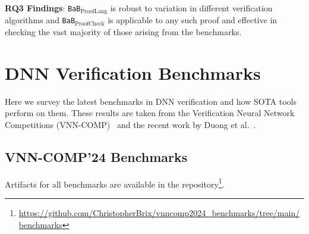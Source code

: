 \documentclass[oneside,11pt,dvipsnames]{book}
\newcommand{\prooflang}{\texttt{BaB$_{\text{ProofLang}}$}}
\newcommand{\proofcheck}{\texttt{BaB$_{\text{ProofCheck}}$}}
\begin{document}
\begin{tcolorbox}[left=1pt,right=1pt,top=1pt,bottom=1pt]
\textbf{RQ3 Findings}: \prooflang{} is robust to variation in different verification algorithms and \proofcheck{} is applicable to any such proof and effective in checking
the vast majority of those arising from the benchmarks.
\end{tcolorbox}


\chapter{DNN Verification Benchmarks}\label{chap:benchmarks}
Here we survey the latest benchmarks in DNN verification and how SOTA tools perform on them.  These results are taken from the Verification Neural Network Competitions (VNN-COMP)~\cite{brix2024fifth} and the recent work by Duong et al.~\cite{duong2024harnessing}.




\section{VNN-COMP'24 Benchmarks}

Artifacts for all benchmarks are available in the repository\footnote{\url{https://github.com/ChristopherBrix/vnncomp2024_benchmarks/tree/main/benchmarks}}.
\end{document}
